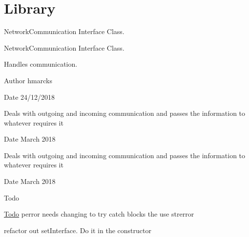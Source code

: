\hypertarget{group__NetworkCommunication}{}\section{Library}
\label{group__NetworkCommunication}


Network\+Communication Interface Class.  


Network\+Communication Interface Class. 

Handles communication.

\begin{DoxyAuthor}{Author}
hmarcks
\end{DoxyAuthor}
\begin{DoxyDate}{Date}
24/12/2018
\end{DoxyDate}
Deals with outgoing and incoming communication and passes the information to whatever requires it

\begin{DoxyDate}{Date}
March 2018
\end{DoxyDate}
Deals with outgoing and incoming communication and passes the information to whatever requires it

\begin{DoxyDate}{Date}
March 2018
\end{DoxyDate}
\begin{DoxyRefDesc}{Todo}
\item[\mbox{\hyperlink{todo__todo000003}{Todo}}]perror needs changing to try catch blocks the use strerror 

refactor out set\+Interface. Do it in the constructor \end{DoxyRefDesc}
